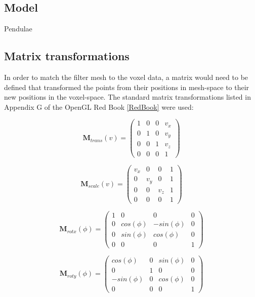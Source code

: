 \subsection{Model}

Pendulae


\subsection{Matrix transformations}

In order to match the filter mesh to the voxel data, a matrix would need to be defined that transformed the points from their positions
in mesh-space to their new positions in the voxel-space.
The standard matrix transformations listed in Appendix G of the OpenGL Red Book \ref{RedBook} were used:

\begin{equation}
	\mathbf{M}_{trans}(v) =
	\left(\begin{array}{cccc}
		1 & 0 & 0 & v_{x} \\
		0 & 1 & 0 & v_{y} \\
		0 & 0 & 1 & v_{z} \\
		0 & 0 & 0 & 1
	\end{array} \right)
\end{equation}

\begin{equation}
	\mathbf{M}_{scale}(v) =
	\left(\begin{array}{cccc}
		v_{x} & 0 & 0 & 1 \\
		0 & v_{y} & 0 & 1 \\
		0 & 0 & v_{z} & 1 \\
		0 & 0 & 0 & 1
	\end{array} \right)
\end{equation}

\begin{equation}
	\mathbf{M}_{rotx}(\phi) =
	\left(\begin{array}{cccc}
		1 & 0 & 0 & 0 \\
		0 & cos(\phi) & -sin(\phi) & 0 \\
		0 & sin(\phi) & cos(\phi) & 0 \\
		0 & 0 & 0 & 1
	\end{array} \right)
\end{equation}

\begin{equation}
	\mathbf{M}_{roty}(\phi) =
	\left(\begin{array}{cccc}
		cos(\phi) & 0 & sin(\phi) & 0 \\
		0 & 1 & 0 & 0 \\
		-sin(\phi) & 0 & cos(\phi) & 0 \\
		0 & 0 & 0 & 1
	\end{array} \right)
\end{equation}

